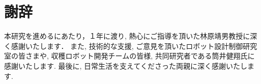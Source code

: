 \chapter*{謝辞}

本研究を進めるにあたり，１年に渡り, 熱心にご指導を頂いた林原靖男教授に深く感謝いたします．
また, 技術的な支援, ご意見を頂いたロボット設計制御研究室の皆さまや, 収穫ロボット開発チームの皆様, 共同研究者である筒井健翔氏に感謝いたします.
最後に, 日常生活を支えてくださった両親に深く感謝いたします.

%
